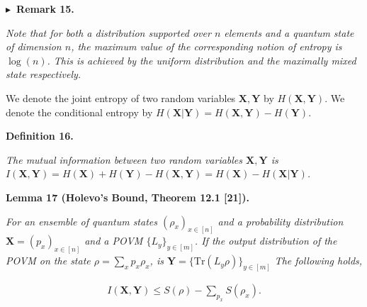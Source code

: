 \documentclass[10pt,a4paper]{article}
\begin{document}
\par\medskip\noindent\textbf{
$\blacktriangleright$ Remark 15.
}\par



\emph{Note that for both a distribution supported over $n$ elements and a quantum state of dimension $n$, the maximum value of the corresponding notion of entropy is $\log(n)$. This is achieved by the uniform distribution and the maximally mixed state respectively.}\par






We denote the joint entropy of two random variables $\mathbf{X},\mathbf{Y}$ by $H(\mathbf{X},\mathbf{Y})$. We denote the conditional entropy by $H(\mathbf{X}|\mathbf{Y})=H(\mathbf{X},\mathbf{Y})-H(\mathbf{Y})$.\par





\par\medskip\noindent\textbf{
\textbf{Definition 16}\textbf{.}
}\par



\emph{The mutual information between two random variables $\mathbf{X},\mathbf{Y}$ is $I(\mathbf{X},\mathbf{Y})=H(\mathbf{X})+H(\mathbf{Y})-H(\mathbf{X},\mathbf{Y})=H(\mathbf{X})-H(\mathbf{X}|\mathbf{Y})$.}\par







\par\medskip\noindent\textbf{
\textbf{Lemma 17}\textbf{ }(Holevo’s Bound, Theorem 12.1 [21])\textbf{.}
}\par



\emph{For an ensemble of quantum states $(\rho_{x})_{x\in[n]}$ and a probability distribution $\mathbf{X}=(p_{x})_{x\in[n]}$ and a POVM $\{L_{y}\}_{y\in[m]}$. If the output distribution of the POVM on the state $\rho=\sum_{x}p_{x}\rho_{x}$, is $\mathbf{Y}=\{\mathrm{Tr}(L_{y}\rho)\}_{y\in[m]}$ The following holds,}\par


\[\begin{gathered}
I(\mathbf{X},\mathbf{Y})\leq S(\rho)-\sum_{p_{x}}S(\rho_{x}).
\end{gathered}\]
\end{document}
